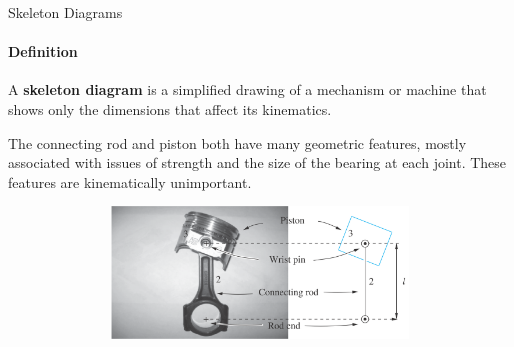 \documentclass[aspectratio=169]{beamer}
\begin{document}
\begin{frame}[t]{Skeleton Diagrams}
\framesubtitle{Definition}
\vspace{-0.3cm}
A \textbf{skeleton diagram} is a simplified drawing of a mechanism or machine that shows only
the dimensions that affect its kinematics.

The connecting rod and piston both
have many geometric features, mostly associated with issues of strength and the size of
the bearing at each joint. These features are kinematically unimportant.
\vspace{-0.5cm}

\begin{figure}[H]
\centering\includegraphics[height=3.5cm,width=1\textwidth,keepaspectratio]{skeleton_diagram.png}
\label{fig:skeleton_diagram.png}
\end{figure}
\end{frame}
\end{document}
